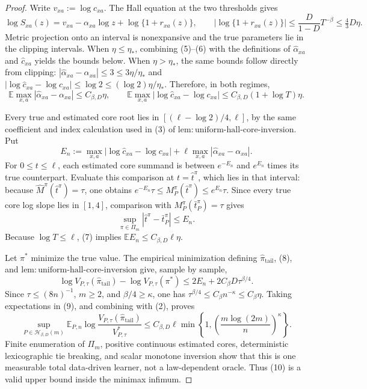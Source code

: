 \documentclass{article}
\begin{document}
\begin{proof}
Write \(v_{xa}:=\log c_{xa}\).  The Hall equation at the two thresholds gives
\[
\log S_{xa}(z)=v_{xa}-\alpha_{xa}\log z+\log\{1+r_{xa}(z)\},
\qquad
|\log\{1+r_{xa}(z)\}|\leq\frac{D}{1-D}T^{-\beta}\leq\tfrac43D\eta.     \tag{6}
\]
Metric projection onto an interval is nonexpansive and the true parameters lie in the clipping intervals.  When \(\eta\leq\eta_*\), combining (5)--(6) with the definitions of \(\widehat\alpha_{xa}\) and \(\widehat c_{xa}\) yields the bounds below.  When \(\eta>\eta_*\), the same bounds follow directly from clipping: \(|\widehat\alpha_{xa}-\alpha_{xa}|\leq3\leq3\eta/\eta_*\) and \(|\log\widehat c_{xa}-\log c_{xa}|\leq\log2\leq(\log2)\eta/\eta_*\).  Therefore, in both regimes,
\[
\mathbb E\max_{x,a}|\widehat\alpha_{xa}-\alpha_{xa}|
\leq C_{\beta,D}\eta,
\qquad
\mathbb E\max_{x,a}|\log\widehat c_{xa}-\log c_{xa}|
\leq C_{\beta,D}(1+\log T)\eta.                                         \tag{7}
\]

Every true and estimated core root lies in \([ (\ell-\log2)/4,\ell]\), by the same coefficient and index calculation used in (3) of \(\mathrm{lem{:}uniform\text{-}hall\text{-}core\text{-}inversion}\).  Put
\[
E_n:=\max_{x,a}|\log\widehat c_{xa}-\log c_{xa}|
+\ell\max_{x,a}|\widehat\alpha_{xa}-\alpha_{xa}|.
\]
For \(0\leq t\leq\ell\), each estimated core summand is between \(e^{-E_n}\) and \(e^{E_n}\) times its true counterpart.  Evaluate this comparison at \(t=\widehat t^\pi\), which lies in that interval: because \(\widehat M^\pi(\widehat t^\pi)=\tau\), one obtains \(e^{-E_n}\tau\leq M_P^\pi(\widehat t^\pi)\leq e^{E_n}\tau\).  Since every true core log slope lies in \([1,4]\), comparison with \(M_P^\pi(\bar t_P^\pi)=\tau\) gives
\[
\sup_{\pi\in\Pi_m}|\widehat t^\pi-\bar t_P^\pi|\leq E_n.              \tag{8}
\]
Because \(\log T\leq\ell\), (7) implies \(\mathbb E E_n\leq C_{\beta,D}\ell\eta\).

Let \(\pi^*\) minimize the true value.  The empirical minimization defining \(\widehat\pi_{\mathrm{tail}}\), (8), and \(\mathrm{lem{:}uniform\text{-}hall\text{-}core\text{-}inversion}\) give, sample by sample,
\[
\log V_{P,\tau}(\widehat\pi_{\mathrm{tail}})-\log V_{P,\tau}(\pi^*)
\leq2E_n+2C_\beta D\tau^{\beta/4}.                                      \tag{9}
\]
Since \(\tau\leq(8n)^{-1}\), \(m\geq2\), and \(\beta/4\geq\kappa\), one has \(\tau^{\beta/4}\leq C_\beta n^{-\kappa}\leq C_\beta\eta\).  Taking expectations in (9), and combining with (2), proves
\[
\sup_{P\in\mathcal H_{\beta,D}(m)}
\mathbb E_{P,n}\log\frac{V_{P,\tau}(\widehat\pi_{\mathrm{tail}})}{V^*_{P,\tau}}
\leq C_{\beta,D}\ell\min\left\{1,\left(\frac{m\log(2m)}n\right)^\kappa\right\}. \tag{10}
\]
Finite enumeration of \(\Pi_m\), positive continuous estimated cores, deterministic lexicographic tie breaking, and scalar monotone inversion show that this is one measurable total data-driven learner, not a law-dependent oracle.  Thus (10) is a valid upper bound inside the minimax infimum.


\end{proof}
\end{document}

